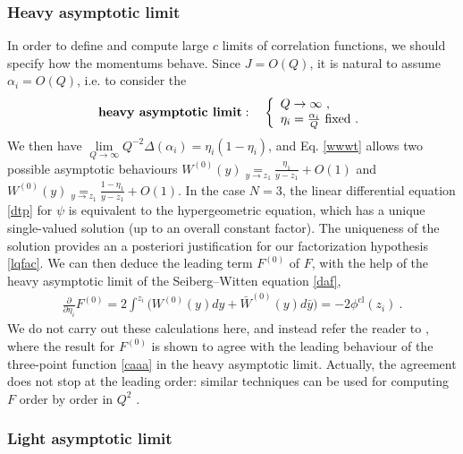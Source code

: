 \documentclass[12pt, a4paper, notitlepage, twoside]{report}
\numberwithin{equation}{section}
\theoremstyle{break}
\begin{document}
\subsubsection{Heavy asymptotic limit}

In order to define and compute large $c$ limits of correlation functions, we should specify how the momentums behave.
Since $J=O(Q)$, it is natural to assume $\alpha_i=O(Q)$, i.e. to consider the 
\begin{align}
 \textbf{\boldmath heavy\ asymptotic\ limit}\index{heavy\ asymptotic\ limit}: \quad \left\{\begin{array}{l}  Q \to \infty \ ,\\ \eta_i=\frac{\alpha_i}{Q}\ \text{fixed}\ .\end{array}\right.  
\end{align}
We then have $\underset{Q\to\infty}{\lim} Q^{-2}\Delta(\alpha_i)=\eta_i(1-\eta_i)$, and Eq. \eqref{wwwt} allows two possible asymptotic behaviours $W^{(0)}(y)\underset{y\to z_1}{=} \frac{\eta_1}{y-z_1} + O(1)$ and 
$W^{(0)}(y)\underset{y\to z_1}{=} \frac{1-\eta_1}{y-z_1} + O(1)$.
In the case $N=3$, the linear differential equation \eqref{dtp} for $\psi$ is equivalent to the hypergeometric equation, which has a unique single-valued solution (up to an overall constant factor).
The uniqueness of the solution provides an a posteriori justification for our factorization hypothesis \eqref{lqfac}.
We can then deduce the leading term $F^{(0)}$ of $F$, with the help of the heavy asymptotic limit of the Seiberg--Witten equation \eqref{daf}, 
\begin{align}
 {\frac{\partial}{\partial \eta_i}} F^{(0)} = 2\int^{z_i}\Big( W^{(0)}(y)dy + \bar W^{(0)}(y)d\bar y\Big) = -2\phi^\text{cl}(z_i)\ .
\end{align}
We do not carry out these calculations here, and instead refer the reader to \cite{zz95}, where the result for $F^{(0)}$ is shown to agree with the leading behaviour of the three-point function \eqref{caaa} in the heavy asymptotic limit.
Actually, the agreement does not stop at the leading order: similar techniques can be used for computing  $F$ order by order in $Q^2$ \cite{cer12}.

\subsubsection{Light asymptotic limit}
\end{document}
